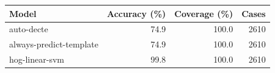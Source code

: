 \begin{tabular}{lrrr}
\toprule
Model & Accuracy (\%) & Coverage (\%) & Cases \\
\midrule
auto-decte & 74.9 & 100.0 & 2610 \\
always-predict-template & 74.9 & 100.0 & 2610 \\
hog-linear-svm & 99.8 & 100.0 & 2610 \\
\bottomrule
\end{tabular}
